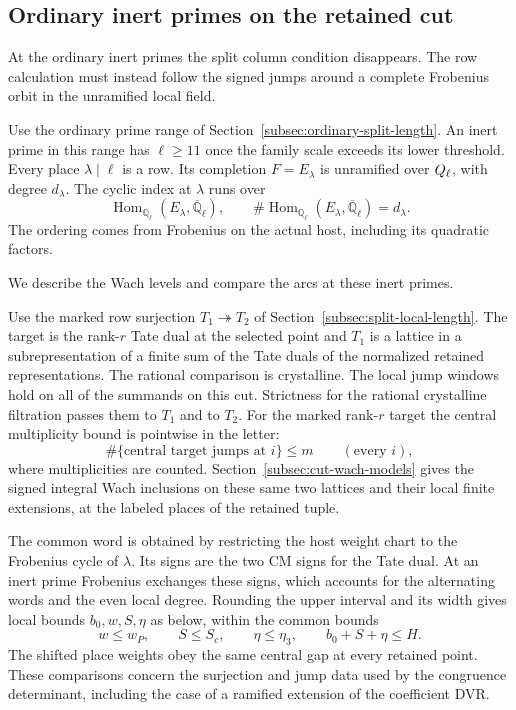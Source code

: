 \subsection{Ordinary inert primes on the retained cut}
\label{subsec:inert-rows}

At the ordinary inert primes the split column condition disappears. The row calculation must instead follow the signed jumps around a complete Frobenius orbit in the unramified local field.

Use the ordinary prime range of Section~\ref{subsec:ordinary-split-length}.
An inert prime in this range has \(\ell\ge11\) once the family scale exceeds its lower threshold. Every place \(\lambda\mid\ell\) is a row. Its completion
\(F=E_\lambda\) is unramified over \(Q_\ell\), with degree \(d_\lambda\).
The cyclic index at \(\lambda\) runs over
\[
 \operatorname{Hom}_{\mathbb Q_\ell}(E_\lambda,\overline{\mathbb Q}_\ell),\qquad \#\operatorname{Hom}_{\mathbb Q_\ell}(E_\lambda,\overline{\mathbb Q}_\ell)=d_\lambda.
\]
The ordering comes from Frobenius on the actual host, including its quadratic factors.

We describe the Wach levels and compare the arcs at these
inert primes.

Use the marked row surjection \(T_1\twoheadrightarrow T_2\) of
Section~\ref{subsec:split-local-length}. The target is the rank-\(r\)
Tate dual at the selected point and \(T_1\) is a lattice in a
subrepresentation of a finite sum of the Tate duals of the normalized
retained representations. The rational comparison is crystalline.
The local jump windows hold on all of the summands on this cut.
Strictness for the rational crystalline filtration passes them to
\(T_1\) and to \(T_2\). For the marked rank-\(r\) target the central multiplicity bound is pointwise in the letter:
\[
 \#\{\text{central target jumps at }i\}\le m\qquad(\text{every }i),
\]
where multiplicities are counted.
Section~\ref{subsec:cut-wach-models} gives the signed integral
Wach inclusions on these same two lattices and their local finite
extensions, at the labeled places of the retained tuple.

The common word is obtained by restricting the host weight chart
to the Frobenius cycle of \(\lambda\). Its signs are the two CM
signs for the Tate dual. At an inert prime Frobenius exchanges
these signs, which accounts for the alternating words and the
even local degree. Rounding the upper interval and its width
gives local bounds \(b_0,w,S,\eta\) as below, within the common bounds
\[
 w\le w_P,\qquad S\le S_c,\qquad \eta\le\eta_3,\qquad b_0+S+\eta\le H.
\]
The shifted place weights obey the same
central gap at every retained point. These comparisons concern
the surjection and jump data used by the congruence determinant,
including the case of a ramified extension of the coefficient DVR.
\label{cor:inert-row-lengths-1}

